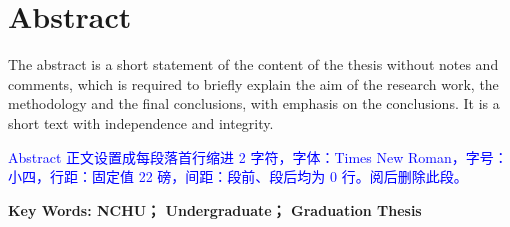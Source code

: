 {\let\clearpage\relax \chapter*{
  \textmd{Abstract}\vskip -3bp}}
\setcounter{page}{2}

\setlength{\parskip}{0em}

The abstract is a short statement of the content of the thesis without notes and comments, which is required to briefly explain the aim of the research work, the methodology and the final conclusions, with emphasis on the conclusions. It is a short text with independence and integrity.

\textcolor{blue}{Abstract 正文设置成每段落首行缩进 2 字符，字体：Times New Roman，字号：小四，行距：固定值 22 磅，间距：段前、段后均为 0 行。阅后删除此段。}

\vspace{3ex}\noindent\textbf{Key Words: NCHU； Undergraduate； Graduation Thesis}
\newpage
